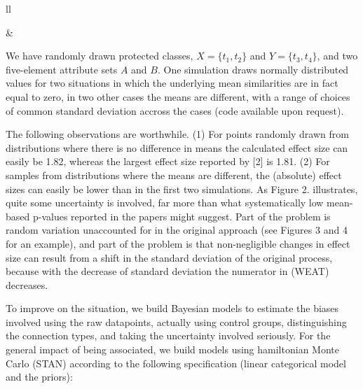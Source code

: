 \documentclass[
  12pt,
  dvipsnames,enabledeprecatedfontcommands]{scrartcl}
\begin{document}
\begin{tabular}{ll}
\begin{minipage}[c]{0.35\linewidth}
\end{minipage}& \begin{minipage}[c]{0.6\linewidth}

We have randomly drawn protected classes, $X=\{t_1,t_2\}$ and $Y=\{t_3,t_4\}$, and two five-element attribute sets $A$ and $B$. One simulation draws normally distributed values  for two situations in which the underlying mean similarities are in fact equal to zero, in two other cases  the means are different, with a range of choices of common standard deviation  accross the cases (code available upon request).

\end{minipage}
\end{tabular}

\vspace{1mm}

The following observations are worthwhile. (1) For points randomly drawn
from distributions where there is no difference in means the calculated
effect size can easily be 1.82, whereas the largest effect size reported
by {[}2{]} is 1.81. (2) For samples from distributions where the means
are different, the (absolute) effect sizes can easily be lower than in
the first two simulations. As Figure 2. illustrates, quite some
uncertainty is involved, far more than what systematically low
mean-based p-values reported in the papers might suggest. Part of the
problem is random variation unaccounted for in the original approach
(see Figures 3 and 4 for an example), and part of the problem is that
non-negligible changes in effect size can result from a shift in the
standard deviation of the original process, because with the decrease of
standard deviation the numerator in (WEAT) decreases.

To improve on the situation, we build Bayesian models to estimate the
biases involved using the raw datapoints, actually using control groups,
distinguishing the connection types, and taking the uncertainty involved
seriously. For the general impact of being associated, we build models
using hamiltonian Monte Carlo (STAN) according to the following
specification (linear categorical model and the priors):
\end{document}
